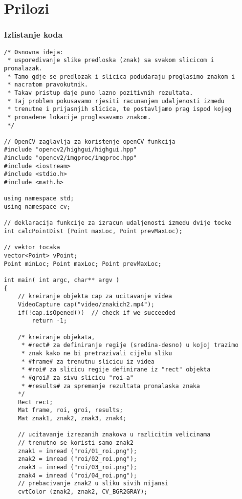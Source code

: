 \newpage

\thispagestyle{empty}
\section*{Prilozi} %
\label{sec:Prilozi}

\subsubsection*{Izlistanje koda} %
\label{ssub:Izlistanje koda}

\begin{lstlisting}[caption={}]
/* Osnovna ideja:
 * usporedivanje slike predloska (znak) sa svakom slicicom i pronalazak.
 * Tamo gdje se predlozak i slicica podudaraju proglasimo znakom i 
 * nacratom pravokutnik.
 * Takav pristup daje puno lazno pozitivnih rezultata.
 * Taj problem pokusavamo rjesiti racunanjem udaljenosti izmedu 
 * trenutne i prijasnjih slicica, te postavljamo prag ispod kojeg
 * pronadene lokacije proglasavamo znakom.
 */ 

// OpenCV zaglavlja za koristenje openCV funkcija
#include "opencv2/highgui/highgui.hpp"
#include "opencv2/imgproc/imgproc.hpp"
#include <iostream>
#include <stdio.h>
#include <math.h>

using namespace std;
using namespace cv;

// deklaracija funkcije za izracun udaljenosti izmedu dvije tocke
int calcPointDist (Point maxLoc, Point prevMaxLoc);

// vektor tocaka
vector<Point> vPoint;
Point minLoc; Point maxLoc; Point prevMaxLoc;

int main( int argc, char** argv )
{
    // kreiranje objekta cap za ucitavanje videa
    VideoCapture cap("video/znakich2.mp4");
    if(!cap.isOpened())  // check if we succeeded
        return -1;

    /* kreiranje objekata, 
     * #rect# za definiranje regije (sredina-desno) u kojoj trazimo 
     * znak kako ne bi pretrazivali cijelu sliku
     * #frame# za trenutnu slicicu iz videa
     * #roi# za slicicu regije definirane iz "rect" objekta
     * #groi# za sivu slicicu "roi-a"
     * #results# za spremanje rezultata pronalaska znaka 
    */
    Rect rect;
    Mat frame, roi, groi, results;
    Mat znak1, znak2, znak3, znak4;
    
    // ucitavanje izrezanih znakova u razlicitim velicinama
    // trenutno se koristi samo znak2 
    znak1 = imread ("roi/01_roi.png");      
    znak2 = imread ("roi/02_roi.png");
    znak3 = imread ("roi/03_roi.png");
    znak4 = imread ("roi/04_roi.png");
    // prebacivanje znak2 u sliku sivih nijansi
    cvtColor (znak2, znak2, CV_BGR2GRAY);
    

\end{lstlisting}
